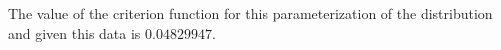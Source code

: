 \documentclass[letterpaper,12pt]{article}
\theoremstyle{definition}
\begin{document}
The value of the criterion function for this parameterization of the distribution
and given this data is $0.04829947$.




\end{document}
